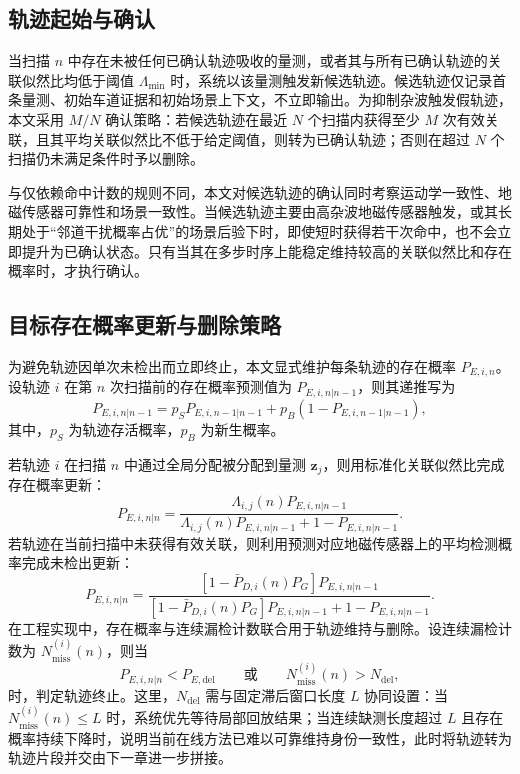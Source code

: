 \documentclass{xdupgthesis}
\begin{document}
\subsection{轨迹起始与确认}

当扫描 $n$ 中存在未被任何已确认轨迹吸收的量测，或者其与所有已确认轨迹的关联似然比均低于阈值 $\Lambda_{\min}$ 时，系统以该量测触发新候选轨迹。候选轨迹仅记录首条量测、初始车道证据和初始场景上下文，不立即输出。为抑制杂波触发假轨迹，本文采用 $M/N$ 确认策略：若候选轨迹在最近 $N$ 个扫描内获得至少 $M$ 次有效关联，且其平均关联似然比不低于给定阈值，则转为已确认轨迹；否则在超过 $N$ 个扫描仍未满足条件时予以删除。

与仅依赖命中计数的规则不同，本文对候选轨迹的确认同时考察运动学一致性、地磁传感器可靠性和场景一致性。当候选轨迹主要由高杂波地磁传感器触发，或其长期处于“邻道干扰概率占优”的场景后验下时，即使短时获得若干次命中，也不会立即提升为已确认状态。只有当其在多步时序上能稳定维持较高的关联似然比和存在概率时，才执行确认。

\subsection{目标存在概率更新与删除策略}

为避免轨迹因单次未检出而立即终止，本文显式维护每条轨迹的存在概率 $P_{E,i,n}$。设轨迹 $i$ 在第 $n$ 次扫描前的存在概率预测值为 $P_{E,i,n|n-1}$，则其递推写为
\begin{equation}
	P_{E,i,n|n-1}=p_S P_{E,i,n-1|n-1}+p_B\left(1-P_{E,i,n-1|n-1}\right),
	\label{eq:ch3_exist_predict_v2}
\end{equation}
其中，$p_S$ 为轨迹存活概率，$p_B$ 为新生概率。

若轨迹 $i$ 在扫描 $n$ 中通过全局分配被分配到量测 $\mathbf z_j$，则用标准化关联似然比完成存在概率更新：
\begin{equation}
	P_{E,i,n|n}=
	\frac{\Lambda_{i,j}(n)P_{E,i,n|n-1}}{\Lambda_{i,j}(n)P_{E,i,n|n-1}+1-P_{E,i,n|n-1}}.
	\label{eq:ch3_exist_hit_v2}
\end{equation}
若轨迹在当前扫描中未获得有效关联，则利用预测对应地磁传感器上的平均检测概率完成未检出更新：
\begin{equation}
	P_{E,i,n|n}=
	\frac{\left[1-\bar P_{D,i}(n)P_G\right]P_{E,i,n|n-1}}{\left[1-\bar P_{D,i}(n)P_G\right]P_{E,i,n|n-1}+1-P_{E,i,n|n-1}}.
	\label{eq:ch3_exist_miss_v2}
\end{equation}
在工程实现中，存在概率与连续漏检计数联合用于轨迹维持与删除。设连续漏检计数为 $N_{\mathrm{miss}}^{(i)}(n)$，则当
\begin{equation}
	P_{E,i,n|n}<P_{E,\mathrm{del}}
	\qquad\text{或}\qquad
	N_{\mathrm{miss}}^{(i)}(n)>N_{\mathrm{del}},
	\label{eq:ch3_delete_v2}
\end{equation}
时，判定轨迹终止。这里，$N_{\mathrm{del}}$ 需与固定滞后窗口长度 $L$ 协同设置：当 $N_{\mathrm{miss}}^{(i)}(n)\le L$ 时，系统优先等待局部回放结果；当连续缺测长度超过 $L$ 且存在概率持续下降时，说明当前在线方法已难以可靠维持身份一致性，此时将轨迹转为轨迹片段并交由下一章进一步拼接。
\end{document}
